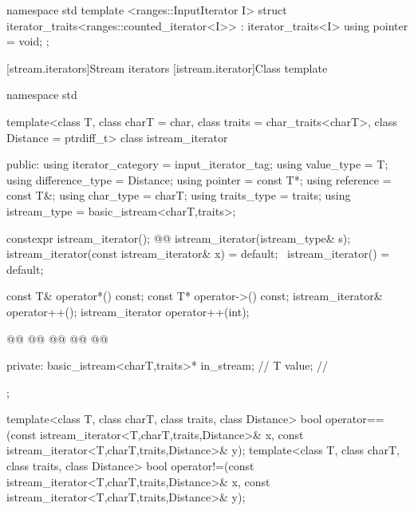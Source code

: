 \begin{addedblock}
\begin{codeblock}
namespace std {
  template <ranges::InputIterator I>
  struct iterator_traits<ranges::counted_iterator<I>> : iterator_traits<I> {
    using pointer = void;
  };
}
\end{codeblock}
\end{addedblock}


[stream.iterators]{Stream iterators}
[istream.iterator]{Class template }


\begin{codeblock}
namespace std {
  template<class T, class charT = char, class traits = char_traits<charT>,
           class Distance = ptrdiff_t>
  class istream_iterator {
  public:
    using iterator_category = input_iterator_tag;
    using value_type        = T;
    using difference_type   = Distance;
    using pointer           = const T*;
    using reference         = const T&;
    using char_type         = charT;
    using traits_type       = traits;
    using istream_type      = basic_istream<charT,traits>;

    constexpr istream_iterator();
    @@
    istream_iterator(istream_type& s);
    istream_iterator(const istream_iterator& x) = default;
    ~istream_iterator() = default;

    const T& operator*() const;
    const T* operator->() const;
    istream_iterator& operator++();
    istream_iterator  operator++(int);

    @@
    @@
    @@
    @@
    @@

  private:
    basic_istream<charT,traits>* in_stream; // \expos
    T value;                                // \expos
  };

  template<class T, class charT, class traits, class Distance>
    bool operator==(const istream_iterator<T,charT,traits,Distance>& x,
            const istream_iterator<T,charT,traits,Distance>& y);
  template<class T, class charT, class traits, class Distance>
    bool operator!=(const istream_iterator<T,charT,traits,Distance>& x,
            const istream_iterator<T,charT,traits,Distance>& y);
}
\end{codeblock}

